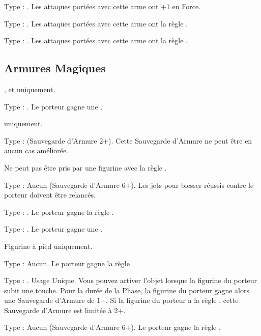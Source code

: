 Type : \hw{}. Les attaques portées avec cette arme ont +1 en Force.

Type : \lance{}. Les attaques portées avec cette arme ont la règle \flamingattacks{}.

Type : \hw{}. Les attaques portées avec cette arme ont la règle .

\endpricelist

\newpage
\hypertarget{magicalarmour}{\subsection{Armures Magiques}}
\label{magical_armour}

\startpricelist

\infantry{}, \warbeasts{} et \cavalry{} uniquement.

Type : \ha{}. Le porteur gagne une .

\infantry{} uniquement.

Type : \ha{} (Sauvegarde d'Armure 2+). Cette Sauvegarde d'Armure ne peut être en aucun cas améliorée.

Ne peut pas être pris par une figurine avec la règle \toweringpresence{}.

Type : Aucun (Sauvegarde d'Armure 6+). Les jets pour blesser réussis contre le porteur doivent être relancés.

Type : \ha{}. Le porteur gagne la règle \distracting{}.

Type : \ha{}. Le porteur gagne une .

Figurine à pied uniquement.

Type : Aucun. Le porteur gagne la règle .

\columnbreak

Type : \ha{}. Usage Unique. Vous pouvez activer l'objet lorsque la figurine du porteur subit une touche. Pour la durée de la Phase, la figurine du porteur gagne alors une Sauvegarde d'Armure de 1+. Si la figurine du porteur a la règle \toweringpresence{}, cette Sauvegarde d'Armure est limitée à 2+.

Type : Aucun (Sauvegarde d'Armure 6+). Le porteur gagne la règle \fireborn{}.

